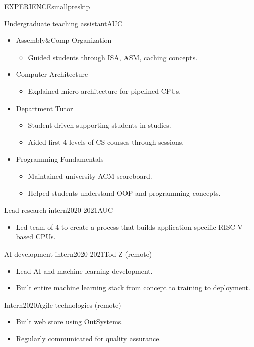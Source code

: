 \documentclass{resume}
\begin{document}
\begin{minipage}[t]{0.44\textwidth}
\begin{rsection}{\MakeUppercase{experience}}{smallpreskip}
		\begin{rcontent}{Undergraduate teaching assistant}{}{AUC}
			\begin{itemize}
				\item Assembly\&Comp Organization 
				\begin{itemize}
					\item Guided students through ISA, ASM, caching concepts.
				\end{itemize}
				\item Computer Architecture 
				\begin{itemize}
					\item Explained micro-architecture for pipelined CPUs.
				\end{itemize}
				\item Department Tutor 
				\begin{itemize}
					\item Student driven  supporting students in studies.
					\item Aided first 4 levels of CS courses through sessions.
				\end{itemize}
				\item Programming Fundamentals 
				\begin{itemize}[after=]
					\item Maintained university ACM scoreboard.
					\item Helped students understand OOP and programming concepts.
				\end{itemize}
			\end{itemize}
		\end{rcontent}
		\divider
		\begin{rcontent}{Lead research intern}{2020-2021}{AUC}
			\begin{itemize}
				\item Led team of 4 to create a process that builds application specific RISC-V based CPUs.
			\end{itemize}
		\end{rcontent}
		\divider
		\begin{rcontent}{AI development intern}{2020-2021}{Tod-Z (remote)}
			\begin{itemize}
				\item Lead AI and machine learning development.
				\item Built entire machine learning stack from concept to training to deployment.
			\end{itemize}
		\end{rcontent}
		\divider
		\begin{rcontent}{Intern}{2020}{Agile technologies (remote)}
			\begin{itemize}
				\item Built web store using OutSystems.
				\item Regularly communicated for quality assurance.
			\end{itemize}
		\end{rcontent}


\end{rsection}
\end{minipage}
\end{document}
